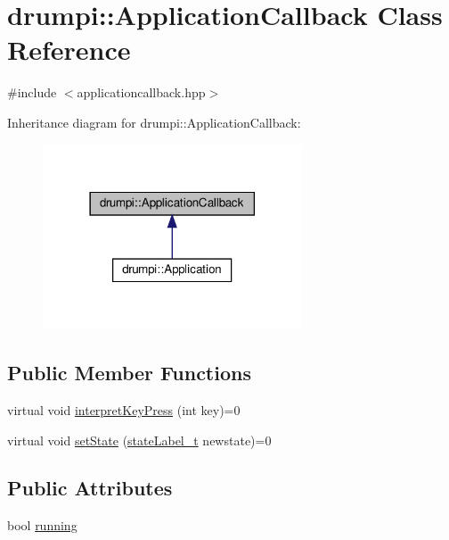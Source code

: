 \hypertarget{classdrumpi_1_1ApplicationCallback}{}\section{drumpi\+:\+:Application\+Callback Class Reference}
\label{classdrumpi_1_1ApplicationCallback}


{\ttfamily \#include $<$applicationcallback.\+hpp$>$}



Inheritance diagram for drumpi\+:\+:Application\+Callback\+:
\nopagebreak
\begin{figure}[H]
\begin{center}
\leavevmode
\includegraphics[width=218pt]{classdrumpi_1_1ApplicationCallback__inherit__graph}
\end{center}
\end{figure}
\subsection*{Public Member Functions}
\begin{DoxyCompactItemize}
\item 
virtual void \hyperlink{classdrumpi_1_1ApplicationCallback_ab3f7606af20b435e8d2db240155c02d1}{interpret\+Key\+Press} (int key)=0
\item 
virtual void \hyperlink{classdrumpi_1_1ApplicationCallback_a009f5eb3ef1d4d3ee339ba3d1c6c52cf}{set\+State} (\hyperlink{namespacedrumpi_af70ab0854d65f24f7fa353fdc1c46bc9}{state\+Label\+\_\+t} newstate)=0
\end{DoxyCompactItemize}
\subsection*{Public Attributes}
\begin{DoxyCompactItemize}
\item 
bool \hyperlink{classdrumpi_1_1ApplicationCallback_a2de8dc466288bf85770cf58422eecc1c}{running}
\end{DoxyCompactItemize}


